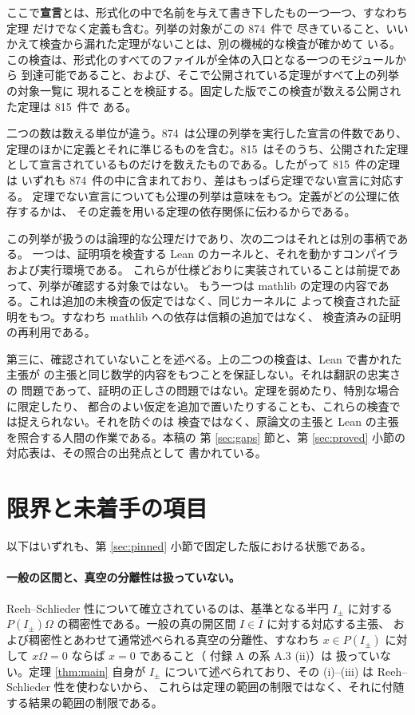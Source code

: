 \documentclass[11pt,a4paper]{article}
\newcommand{\auditcount}{874}
\newcommand{\coveragecount}{815}
\theoremstyle{definition}
\begin{document}
ここで\textbf{宣言}とは、形式化の中で名前を与えて書き下したもの一つ一つ、すなわち定理
だけでなく定義も含む。列挙の対象がこの \auditcount\ 件で
尽きていること、いいかえて検査から漏れた定理がないことは、別の機械的な検査が確かめて
いる。この検査は、形式化のすべてのファイルが全体の入口となる一つのモジュールから
到達可能であること、および、そこで公開されている定理がすべて上の列挙の対象一覧に
現れることを検証する。固定した版でこの検査が数える公開された定理は \coveragecount\ 件で
ある。

二つの数は数える単位が違う。\auditcount\ は公理の列挙を実行した宣言の件数であり、
定理のほかに定義とそれに準じるものを含む。\coveragecount\ はそのうち、公開された定理
として宣言されているものだけを数えたものである。したがって \coveragecount\ 件の定理は
いずれも \auditcount\ 件の中に含まれており、差はもっぱら定理でない宣言に対応する。
定理でない宣言についても公理の列挙は意味をもつ。定義がどの公理に依存するかは、
その定義を用いる定理の依存関係に伝わるからである。

この列挙が扱うのは論理的な公理だけであり、次の二つはそれとは別の事柄である。
一つは、証明項を検査する Lean のカーネルと、それを動かすコンパイラおよび実行環境である。
これらが仕様どおりに実装されていることは前提であって、列挙が確認する対象ではない。
もう一つは mathlib の定理の内容である。これは追加の未検査の仮定ではなく、同じカーネルに
よって検査された証明をもつ。すなわち mathlib への依存は信頼の追加ではなく、
検査済みの証明の再利用である。

第三に、確認されていないことを述べる。上の二つの検査は、Lean で書かれた主張が
\cite{T26} の主張と同じ数学的内容をもつことを保証しない。それは翻訳の忠実さの
問題であって、証明の正しさの問題ではない。定理を弱めたり、特別な場合に限定したり、
都合のよい仮定を追加で置いたりすることも、これらの検査では捉えられない。それを防ぐのは
検査ではなく、原論文の主張と Lean の主張を照合する人間の作業である。本稿の
第 \ref{sec:gaps} 節と、第 \ref{sec:proved} 小節の対応表は、その照合の出発点として
書かれている。

\section{限界と未着手の項目}
\label{sec:limits}

以下はいずれも、第 \ref{sec:pinned} 小節で固定した版における状態である。

\paragraph{一般の区間と、真空の分離性は扱っていない。}
Reeh--Schlieder 性について確立されているのは、基準となる半円 $I_\pm$ に対する
$P(I_\pm)\Omega$ の稠密性である。一般の真の開区間 $I \in \hat{I}$ に対する対応する主張、
および稠密性とあわせて通常述べられる真空の分離性、すなわち $x \in P(I_\pm)$ に対して
$x\Omega = 0$ ならば $x = 0$ であること（\cite{CRTT25} 付録 A の系 A.3 (ii)）は
扱っていない。定理 \ref{thm:main} 自身が
$I_\pm$ について述べられており、その (i)--(iii) は Reeh--Schlieder 性を使わないから、
これらは定理の範囲の制限ではなく、それに付随する結果の範囲の制限である。
\end{document}
